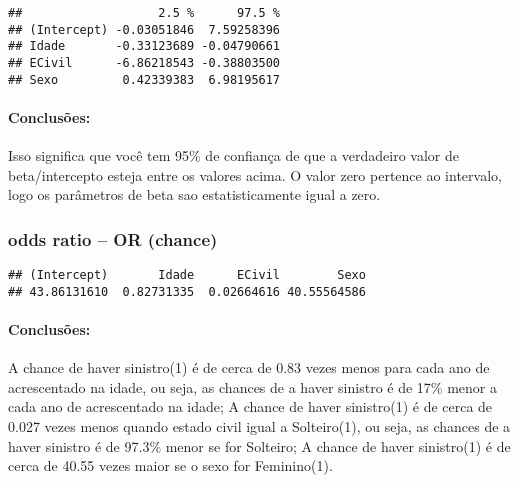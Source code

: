 \documentclass[
]{article}
\newenvironment{Shaded}{\begin{snugshade}}{\end{snugshade}}
\newcommand{\FunctionTok}[1]{\textcolor[rgb]{0.13,0.29,0.53}{\textbf{#1}}}
\newcommand{\NormalTok}[1]{#1}
\newcommand{\OtherTok}[1]{\textcolor[rgb]{0.56,0.35,0.01}{#1}}
\newcommand{\SpecialCharTok}[1]{\textcolor[rgb]{0.81,0.36,0.00}{\textbf{#1}}}
\begin{document}
\begin{verbatim}
##                   2.5 %      97.5 %
## (Intercept) -0.03051846  7.59258396
## Idade       -0.33123689 -0.04790661
## ECivil      -6.86218543 -0.38803500
## Sexo         0.42339383  6.98195617
\end{verbatim}

\hypertarget{conclusuxf5es-14}{%
\paragraph{Conclusões:}\label{conclusuxf5es-14}}

Isso significa que você tem 95\% de confiança de que a verdadeiro valor
de beta/intercepto esteja entre os valores acima. O valor zero pertence
ao intervalo, logo os parâmetros de beta sao estatisticamente igual a
zero.

\hypertarget{odds-ratio-or-chance}{%
\subsubsection{odds ratio -- OR (chance)}\label{odds-ratio-or-chance}}

\begin{Shaded}
\end{Shaded}

\begin{verbatim}
## (Intercept)       Idade      ECivil        Sexo 
## 43.86131610  0.82731335  0.02664616 40.55564586
\end{verbatim}

\hypertarget{conclusuxf5es-15}{%
\paragraph{Conclusões:}\label{conclusuxf5es-15}}

A chance de haver sinistro(1) é de cerca de 0.83 vezes menos para cada
ano de acrescentado na idade, ou seja, as chances de a haver sinistro é
de 17\% menor a cada ano de acrescentado na idade; A chance de haver
sinistro(1) é de cerca de 0.027 vezes menos quando estado civil igual a
Solteiro(1), ou seja, as chances de a haver sinistro é de 97.3\% menor
se for Solteiro; A chance de haver sinistro(1) é de cerca de 40.55 vezes
maior se o sexo for Feminino(1).
\end{document}
